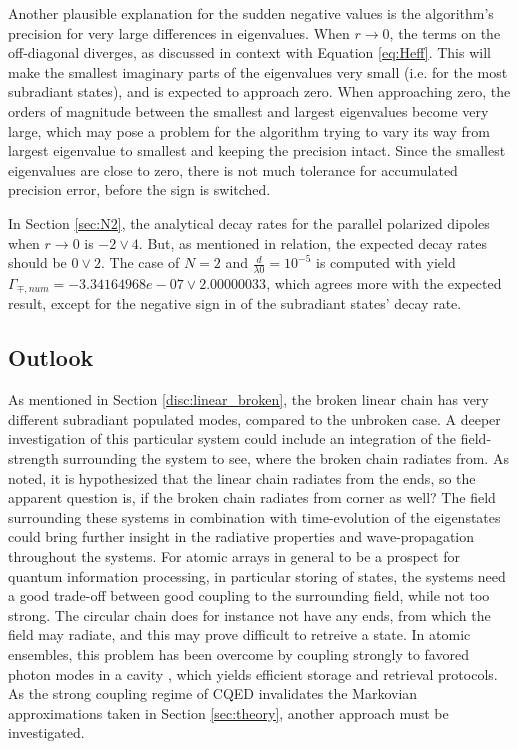 \documentclass{article}
\begin{document}
Another plausible explanation for the sudden negative values is the algorithm's precision for very large differences in eigenvalues. When $r\rightarrow 0$, the terms on the off-diagonal diverges, as discussed in context with Equation \ref{eq:Heff}. This will make the smallest imaginary parts of the eigenvalues very small (i.e. for the most subradiant states), and is expected to approach zero. When approaching zero, the orders of magnitude between the smallest and largest eigenvalues become very large, which may pose a problem for the algorithm trying to vary its way from largest eigenvalue to smallest and keeping the precision intact. Since the smallest eigenvalues are close to zero, there is not much tolerance for accumulated precision error, before the sign is switched. 

In Section \ref{sec:N2}, the analytical decay rates for the parallel polarized dipoles when $r \rightarrow 0$ is $-2 \vee 4$. But, as mentioned in relation, the expected decay rates should be $0 \vee 2$. The case of $N=2$ and $\frac{d}{\lambda0} = 10^{-5}$ is computed with yield $\Gamma_{\mp, num} = -3.34164968e-07 \vee 2.00000033$, which agrees more with the expected result, except for the negative sign in of the subradiant states' decay rate. 

\subsection{Outlook}\label{sec:outlook}

\noindent
As mentioned in Section \ref{disc:linear_broken}, the broken linear chain has very different subradiant populated modes, compared to the unbroken case. A deeper investigation of this particular system could include an integration of the field-strength surrounding the system to see, where the broken chain radiates from. As noted, it is hypothesized that the linear chain radiates from the ends, so the apparent question is, if the broken chain radiates from corner as well? The field surrounding these systems in combination with time-evolution of the eigenstates could bring further insight in the radiative properties and wave-propagation throughout the systems. For atomic arrays in general to be a prospect for quantum information processing, in particular storing of states, the systems need a good trade-off between good coupling to the surrounding field, while not too strong. The circular chain does for instance not have any ends, from which the field may radiate, and this may prove difficult to retreive a state. In atomic ensembles, this problem has been overcome by coupling strongly to favored photon modes in a cavity \cite{Yong}, which yields efficient storage and retrieval protocols. As the strong coupling regime of CQED invalidates the Markovian approximations taken in Section \ref{sec:theory}, another approach must be investigated. 
\end{document}
